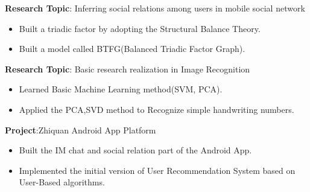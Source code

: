 \documentclass{resume}
\begin{document}
\textbf{Research Topic}: Inferring social relations among users in mobile social network
\begin{itemize}
\item Built a triadic factor by adopting the Structural Balance Theory.
\item Built a model called BTFG(Balanced Triadic Factor Graph).
\end{itemize}

\textbf{Research Topic}: Basic research realization in Image Recognition
\begin{itemize}
\item  Learned Basic Machine Learning method(SVM, PCA).
\item Applied the PCA,SVD method to Recognize simple handwriting numbers.
\end{itemize}




\textbf{Project}:Zhiquan Android App Platform
\begin{itemize}
\item Built the IM chat and social relation part of the Android App.
\item Implemented the initial version of User Recommendation System based on User-Based algorithms.
\end{itemize}

%
%

\end{document}
